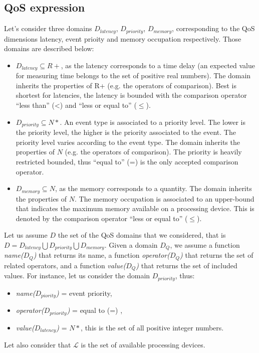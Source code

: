 \subsection{QoS expression}
Let's consider three domains $D_{latency}$, $D_{priority}$, $D_{memory}$, corresponding to the QoS dimensions latency, event prioity and memory occupation respectively.
Those domains are described below:
\begin{itemize}
 \item $D_{latency} \subseteq R+$, as the latency corresponds to a time delay (an expected value for measuring time belongs to the set of positive real numbers). The domain inherits the properties of R+ (e.g. the operators of comparison). Best is shortest for latencies, the latency is bounded with the comparison operator ``less than'' (<) and ``less or equal to'' ($\leq$). 
 \item $D_{priority} \subseteq N*$. An event type is associated to a priority level. The lower is the priority level, the higher is the priority associated to the event. The priority level varies according to the event type. The domain inherits the properties of $N$ (e.g. the operators of comparison). 
 The priority is heavily restricted bounded, thus ``equal to'' (=) is the only accepted comparison operator.
 \item $D_{memory}  \subseteq N$, as the memory corresponds to a quantity. The domain inherits the properties of $N$. The memory occupation is associated to an upper-bound that indicates the maximum memory available on a processing device. This is denoted by the comparison operator ``less or equal to'' ($\leq$).  
\end{itemize}
Let us assume $D$ the set of the QoS domains that we considered, that is $D = D_{latency} \bigcup D_{priority} \bigcup D_{memory}$.
Given a domain $D_Q$, we assume a function \textit{name($D_Q$)} that returns its  name, a function \textit{operator($D_Q$)} that returns the set of related operators, and a function \textit{value($D_Q$)} that returns the set of included values.
For instance, let us consider the domain $D_{priority}$, thus: 
\begin{itemize}
 \item \textit{name($D_{piority}$)} = event priority,
 \item \textit{operator($D_{priority}$)} = { equal to (=) },
 \item \textit{value($D_{latency}$)} = $N*$, this is the set of all positive integer numbers.
\end{itemize}
Let also consider that $\mathcal{L}$ is the set of available processing devices.
